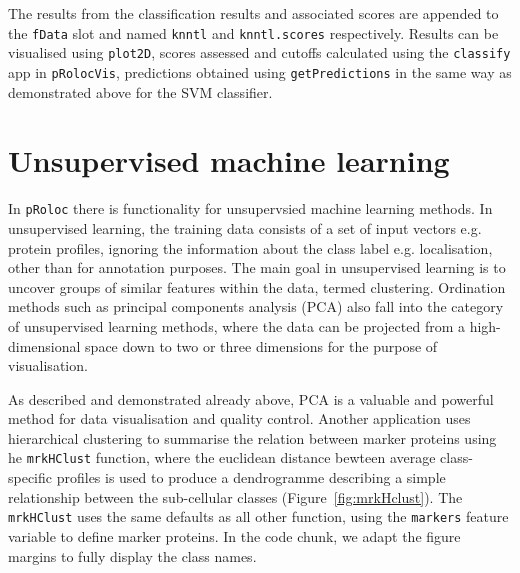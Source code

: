 \begin{knitrout}
\begin{kframe}
\begin{alltt}
 \hlkwb{<-}     \hlstd{=} \hlstd{(}\hlstd{,} \hlstd{))}
\end{alltt}
\end{kframe}
\end{knitrout}

The results from the classification results and associated scores are
appended to the \texttt{fData} slot and named \texttt{knntl} and
\texttt{knntl.scores} respectively. Results can be visualised using
\texttt{plot2D}, scores assessed and cutoffs calculated using the
\texttt{classify} app in \texttt{pRolocVis}, predictions obtained
using \texttt{getPredictions} in the same way as demonstrated above
for the SVM classifier.

\section*{Unsupervised machine learning}

In \texttt{pRoloc} there is functionality for unsupervsied machine
learning methods. In unsupervised learning, the training data consists
of a set of input vectors e.g. protein profiles, ignoring the
information about the class label e.g. localisation, other than for
annotation purposes. The main goal in unsupervised learning is to
uncover groups of similar features within the data, termed
clustering. Ordination methods such as principal components analysis
(PCA) also fall into the category of unsupervised learning methods,
where the data can be projected from a high-dimensional space down to
two or three dimensions for the purpose of visualisation.

As described and demonstrated already above, PCA is a valuable and
powerful method for data visualisation and quality control. Another
application uses hierarchical clustering to summarise the relation
between marker proteins using he \texttt{mrkHClust} function, where
the euclidean distance bewteen average class-specific profiles is used
to produce a dendrogramme describing a simple relationship between the
sub-cellular classes (Figure~\ref{fig:mrkHclust}). The
\texttt{mrkHClust} uses the same defaults as all other function, using
the \texttt{markers} feature variable to define marker proteins. In
the code chunk, we adapt the figure margins to fully display the class
names.

